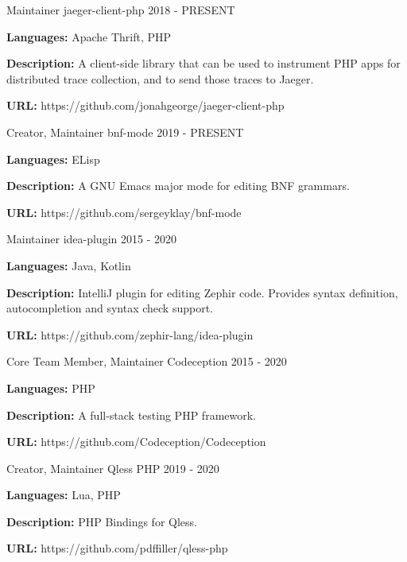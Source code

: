 \begin{cventries}
  \cventry
    {Maintainer}
    {jaeger-client-php}
    {}
    {2018 - PRESENT}
    {
      \begin{cvitems}
        \item {\textbf{Languages:} Apache Thrift, PHP}
        \item {\textbf{Description:} A client-side library that can be used to instrument PHP apps for distributed trace collection, and to send those traces to Jaeger.}
        \item {\textbf{URL:} https://github.com/jonahgeorge/jaeger-client-php}
      \end{cvitems}
    }

  \cventry
    {Creator, Maintainer}
    {bnf-mode}
    {}
    {2019 - PRESENT}
    {
      \begin{cvitems}
        \item {\textbf{Languages:} ELisp}
        \item {\textbf{Description:} A GNU Emacs major mode for editing BNF grammars.}
        \item {\textbf{URL:} https://github.com/sergeyklay/bnf-mode}
      \end{cvitems}
    }

  \cventry
    {Maintainer}
    {idea-plugin}
    {}
    {2015 - 2020}
    {
      \begin{cvitems}
        \item {\textbf{Languages:} Java, Kotlin}
        \item {\textbf{Description:} IntelliJ plugin for editing Zephir code. Provides syntax definition, autocompletion and syntax check support.}
        \item {\textbf{URL:} https://github.com/zephir-lang/idea-plugin}
      \end{cvitems}
    }

  \cventry
    {Core Team Member, Maintainer}
    {Codeception}
    {}
    {2015 - 2020}
    {
      \begin{cvitems}
        \item {\textbf{Languages:} PHP}
        \item {\textbf{Description:} A full-stack testing PHP framework.}
        \item {\textbf{URL:} https://github.com/Codeception/Codeception}
      \end{cvitems}
    }

  \cventry
    {Creator, Maintainer}
    {Qless PHP}
    {}
    {2019 - 2020}
    {
      \begin{cvitems}
        \item {\textbf{Languages:} Lua, PHP}
        \item {\textbf{Description:} PHP Bindings for Qless.}
        \item {\textbf{URL:} https://github.com/pdffiller/qless-php}
      \end{cvitems}
    }


\end{cventries}

